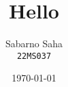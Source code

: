 \documentclass{scrartcl}
\begin{document}
\title{Hello}
    \author{Sabarno Saha \\ \texttt{22MS037}}
    \date{\today}
    \maketitle
\end{document}
